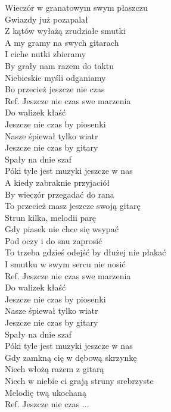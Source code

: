
Wieczór w granatowym swym płaszczu \\
Gwiazdy już pozapalał \tab{} \\
Z kątów wyłażą zrudziałe smutki \\
A my gramy na swych gitarach \\
I ciche nutki zbieramy\tab{} \\
By grały nam razem do taktu \tab{}\\
Niebieskie myśli odganiamy \tab{}\\
Bo przecież jeszcze nie czas \tab{}\\
\hops
Ref. Jeszcze nie czas swe marzenia  \\
 Do walizek kłaść \tab{} \\
 Jeszcze nie czas by piosenki \\
 Nasze śpiewał tylko wiatr \tab{}\\
 Jeszcze nie czas by gitary \tab{}\\
 Spały na dnie szaf \tab{}\\
 Póki tyle jest muzyki jeszcze w nas \\
\hops
A kiedy zabraknie przyjaciół \\
By wieczór przegadać do rana \\
To przecież masz jeszcze swoją gitarę \\
Strun kilka, melodii parę \\
Gdy piasek nie chce się wsypać \\
Pod oczy i do snu zaprosić \\
To trzeba gdzieś odejść by dłużej nie płakać \\
I smutku w swym sercu nie nosić \\
\hops
Ref. Jeszcze nie czas swe marzenia \\
 Do walizek kłaść \\
 Jeszcze nie czas by piosenki \\
 Nasze śpiewał tylko wiatr \\
 Jeszcze nie czas by gitary \\
 Spały na dnie szaf \\
 Póki tyle jest muzyki jeszcze w nas \\
\hops
Gdy zamkną cię w dębową skrzynkę \\
Niech włożą razem z gitarą \\
Niech w niebie ci grają struny srebrzyste \\
Melodię twą ukochaną \\
\hops
Ref. Jeszcze nie czas ...